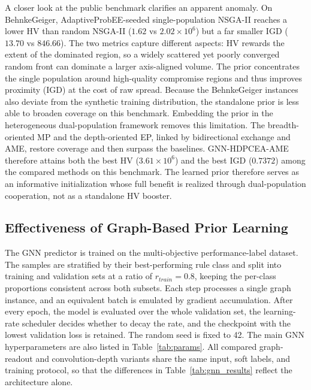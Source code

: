 \documentclass[pdflatex,iicol,Numbered,sn-basic]{sn-jnl}
\begin{document}
A closer look at the public benchmark clarifies an apparent anomaly. On BehnkeGeiger, AdaptiveProbEE-seeded single-population NSGA-II reaches a lower HV than random NSGA-II ($1.62$ vs $2.02\times10^{6}$) but a far smaller IGD ($13.70$ vs $846.66$).
The two metrics capture different aspects: HV rewards the extent of the dominated region, so a widely scattered yet poorly converged random front can dominate a larger axis-aligned volume. The prior concentrates the single population around high-quality compromise regions and thus improves proximity (IGD) at the cost of raw spread.
Because the BehnkeGeiger instances also deviate from the synthetic training distribution, the standalone prior is less able to broaden coverage on this benchmark.
Embedding the prior in the heterogeneous dual-population framework removes this limitation. The breadth-oriented MP and the depth-oriented EP, linked by bidirectional exchange and AME, restore coverage and then surpass the baselines. GNN-HDPCEA-AME therefore attains both the best HV ($3.61\times10^{6}$) and the best IGD ($0.7372$) among the compared methods on this benchmark.
The learned prior therefore serves as an informative initialization whose full benefit is realized through dual-population cooperation, not as a standalone HV booster.


\subsection{Effectiveness of Graph-Based Prior Learning}\label{subsec:rq2}

The GNN predictor is trained on the multi-objective performance-label dataset. The samples are stratified by their best-performing rule class and split into training and validation sets at a ratio of $r_{train}=0.8$, keeping the per-class proportions consistent across both subsets. Each step processes a single graph instance, and an equivalent batch is emulated by gradient accumulation. After every epoch, the model is evaluated over the whole validation set, the learning-rate scheduler decides whether to decay the rate, and the checkpoint with the lowest validation loss is retained. The random seed is fixed to 42.
The main GNN hyperparameters are also listed in Table~\ref{tab:params}.
All compared graph-readout and convolution-depth variants share the same input, soft labels, and training protocol, so that the differences in Table~\ref{tab:gnn_results} reflect the architecture alone.
\end{document}
